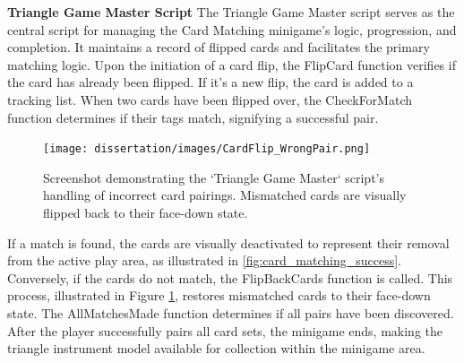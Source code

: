 \documentclass{l4proj}
\begin{document}
\textbf{Triangle Game Master Script} \newline
The Triangle Game Master script serves as the central script for managing the Card Matching minigame's logic, progression, and completion. It maintains a record of flipped cards and facilitates the primary matching logic. Upon the initiation of a card flip, the FlipCard function verifies if the card has already been flipped. If it's a new flip, the card is added to a tracking list. When two cards have been flipped over, the CheckForMatch function determines if their tags match, signifying a successful pair.

\begin{figure}[h]
  \centering
  \texttt{[image: dissertation/images/CardFlip\_WrongPair.png]} 
  \caption{Screenshot demonstrating the `Triangle Game Master` script's handling of incorrect card pairings. Mismatched cards are visually flipped back to their face-down state.} 
  \label{fig:card_mismatch} 
\end{figure}

If a match is found, the cards are visually deactivated to represent their removal from the active play area, as illustrated in \ref{fig:card_matching_success}. Conversely, if the cards do not match, the FlipBackCards function is called. This process, illustrated in Figure \ref{fig:card_mismatch}, restores mismatched cards to their face-down state. The AllMatchesMade function determines if all pairs have been discovered. After the player successfully pairs all card sets, the minigame ends, making the triangle instrument model available for collection within the minigame area.
\end{document}
